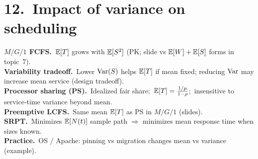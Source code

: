 \section*{12.\ Impact of variance on scheduling}
\textbf{$M/G/1$ FCFS.}\ $\mathbb{E}[T]$ grows with $\mathbb{E}[S^2]$ (PK; slide vs $\mathbb{E}[W]+\mathbb{E}[S]$ forms in topic~7).\\
\textbf{Variability tradeoff.}\ Lower $\mathrm{Var}(S)$ helps $\mathbb{E}[T]$ if mean fixed; reducing $\mathrm{Var}$ may increase mean service (design tradeoff).\\
\textbf{Processor sharing (PS).}\ Idealized fair share;\ $\mathbb{E}[T]=\frac{1/\mu}{1-\rho}$;\ insensitive to service-time variance beyond mean.\\
\textbf{Preemptive LCFS.}\ Same mean $\mathbb{E}[T]$ as PS in $M/G/1$ (slides).\\
\textbf{SRPT.}\ Minimizes $\mathbb{E}[N(t)]$ sample path $\Rightarrow$ minimizes mean response time when sizes known.\\
\textbf{Practice.}\ OS / Apache: pinning vs migration changes mean vs variance (example).
